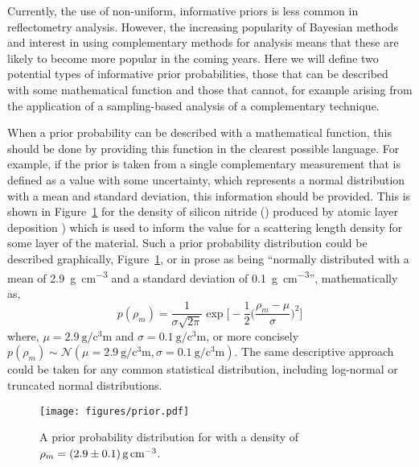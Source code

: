 \documentclass[reprint,superscriptaddress,aps,amsmath,linenumbers]{revtex4-2}
\begin{document}
Currently, the use of non-uniform, informative priors is less common in reflectometry analysis.
However, the increasing popularity of Bayesian methods and interest in using complementary methods for analysis means that these are likely to become more popular in the coming years. 
Here we will define two potential types of informative prior probabilities, those that can be described with some mathematical function and those that cannot, for example arising from the application of a sampling-based analysis of a complementary technique. 

When a prior probability can be described with a mathematical function, this should be done by providing this function in the clearest possible language. 
For example, if the prior is taken from a single complementary measurement that is defined as a value with some uncertainty, which represents a normal distribution with a mean and standard deviation, this information should be provided. 
This is shown in Figure~\ref{fig:prior} for the density of silicon nitride () produced by atomic layer deposition \cite{knoops_atomic_2015}) which is used to inform the value for a scattering length density for some layer of the material.
Such a prior probability distribution could be described graphically, Figure~\ref{fig:prior}, or in prose as being ``normally distributed with a mean of \SI{2.9}{\gram\per\cubic\centi\meter} and a standard deviation of \SI{0.1}{\gram\per\cubic\centi\meter}'', mathematically as, 
%
\begin{equation}
  p(\rho_m) = \frac{1}{\sigma\sqrt{2\pi}}\exp\Bigg[-\frac{1}{2}\bigg(\frac{\rho_m-\mu}{\sigma}\bigg)^2\Bigg]
\end{equation}
%
where, $\mu=\SI{2.9}{\gram\per\cubic\centi\meter}$ and $\sigma=\SI{0.1}{\gram\per\cubic\centi\meter}$, or more concisely $p(\rho_m) \sim \mathcal{N}(\mu=\SI{2.9}{\gram\per\cubic\centi\meter}, \sigma=\SI{0.1}{\gram\per\cubic\centi\meter})$. 
The same descriptive approach could be taken for any common statistical distribution, including log-normal or truncated normal distributions. 
%
\begin{figure}
  \texttt{[image: figures/prior.pdf]}
  \caption{
    A prior probability distribution for  with a density of $\rho_m=\SI{2.9\pm0.1}{\gram\per\cubic\centi\meter}$. 
  }
  \label{fig:prior}
\end{figure}
%
\end{document}
